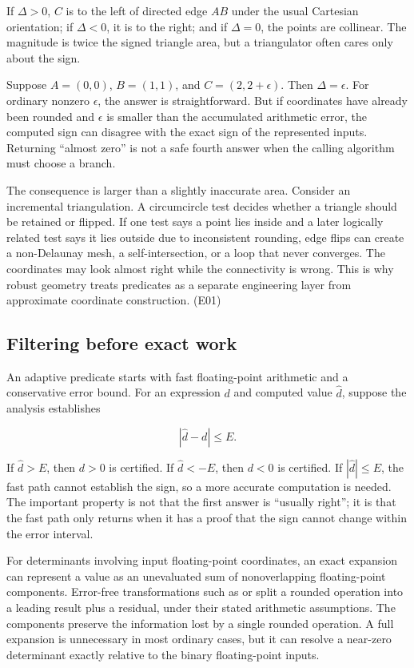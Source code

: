 If \(\Delta>0\), \(C\) is to the left of directed edge \(AB\) under the usual Cartesian orientation; if \(\Delta<0\), it is to the right; and if \(\Delta=0\), the points are collinear. The magnitude is twice the signed triangle area, but a triangulator often cares only about the sign.

Suppose \(A=(0,0)\), \(B=(1,1)\), and \(C=(2,2+\epsilon)\). Then \(\Delta=\epsilon\). For ordinary nonzero \(\epsilon\), the answer is straightforward. But if coordinates have already been rounded and \(\epsilon\) is smaller than the accumulated arithmetic error, the computed sign can disagree with the exact sign of the represented inputs. Returning ``almost zero'' is not a safe fourth answer when the calling algorithm must choose a branch.

The consequence is larger than a slightly inaccurate area. Consider an incremental triangulation. A circumcircle test decides whether a triangle should be retained or flipped. If one test says a point lies inside and a later logically related test says it lies outside due to inconsistent rounding, edge flips can create a non-Delaunay mesh, a self-intersection, or a loop that never converges. The coordinates may look almost right while the connectivity is wrong. This is why robust geometry treats predicates as a separate engineering layer from approximate coordinate construction. (E01)

\subsection{Filtering before exact work}\label{02-foundations-ii-ch034-filtering-before-exact-work}

\hypertarget{02-foundations-ii-ch034-filtering-before-exact-work}{}

An adaptive predicate starts with fast floating-point arithmetic and a conservative error bound. For an expression \(d\) and computed value \(\widehat d\), suppose the analysis establishes

\[
|\widehat d-d|\le E.
\]

If \(\widehat d>E\), then \(d>0\) is certified. If \(\widehat d<-E\), then \(d<0\) is certified. If \(|\widehat d|\le E\), the fast path cannot establish the sign, so a more accurate computation is needed. The important property is not that the first answer is ``usually right''; it is that the fast path only returns when it has a proof that the sign cannot change within the error interval.

For determinants involving input floating-point coordinates, an exact expansion can represent a value as an unevaluated sum of nonoverlapping floating-point components. Error-free transformations such as  or  split a rounded operation into a leading result plus a residual, under their stated arithmetic assumptions. The components preserve the information lost by a single rounded operation. A full expansion is unnecessary in most ordinary cases, but it can resolve a near-zero determinant exactly relative to the binary floating-point inputs.

